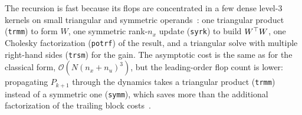 The recursion is fast because its flops are concentrated in a few dense level-3
kernels on small triangular and symmetric operands~\cite{frison2018blasfeo}: one triangular product
(\texttt{trmm}) to form $W$, one symmetric rank-$n_x$ update (\texttt{syrk}) to
build $W^\top W$, one Cholesky factorization (\texttt{potrf}) of the result, and a
triangular solve with multiple right-hand sides (\texttt{trsm}) for the gain.
The asymptotic cost is the same as for the classical form,
$\mathcal{O}\!\left(N (n_x + n_u)^3\right)$, but the leading-order flop count is
lower: propagating $P_{k+1}$ through the dynamics takes a triangular product
(\texttt{trmm}) instead of a symmetric one (\texttt{symm}), which saves more than
the additional factorization of the trailing block costs~\cite{frison2013efficient}.

\newpage
\clearpage